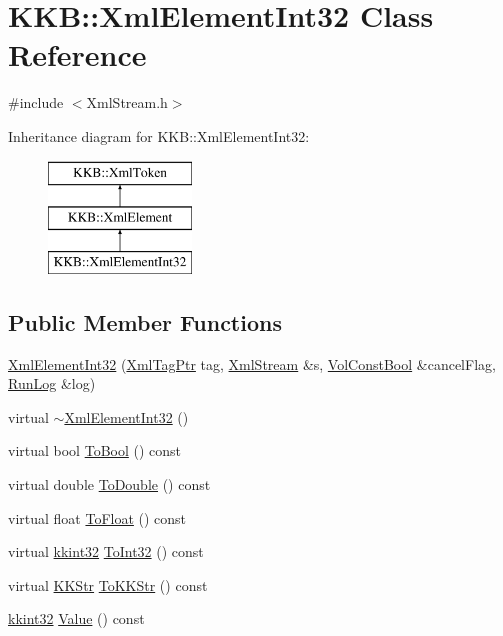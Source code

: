 \hypertarget{class_k_k_b_1_1_xml_element_int32}{}\section{K\+KB\+:\+:Xml\+Element\+Int32 Class Reference}
\label{class_k_k_b_1_1_xml_element_int32}


{\ttfamily \#include $<$Xml\+Stream.\+h$>$}

Inheritance diagram for K\+KB\+:\+:Xml\+Element\+Int32\+:\begin{figure}[H]
\begin{center}
\leavevmode
\includegraphics[height=3.000000cm]{class_k_k_b_1_1_xml_element_int32}
\end{center}
\end{figure}
\subsection*{Public Member Functions}
\begin{DoxyCompactItemize}
\item 
\hyperlink{class_k_k_b_1_1_xml_element_int32_a4f9c90b3dd3ba7e3b9fcb6b60d665d1a}{Xml\+Element\+Int32} (\hyperlink{namespace_k_k_b_a9253a3ea8a5da18ca82be4ca2b390ef0}{Xml\+Tag\+Ptr} tag, \hyperlink{class_k_k_b_1_1_xml_stream}{Xml\+Stream} \&s, \hyperlink{namespace_k_k_b_a7d390f568e2831fb76b86b56c87bf92f}{Vol\+Const\+Bool} \&cancel\+Flag, \hyperlink{class_k_k_b_1_1_run_log}{Run\+Log} \&log)
\item 
virtual \hyperlink{class_k_k_b_1_1_xml_element_int32_afb0b464cfaeac317a6f51b94c3accbcf}{$\sim$\+Xml\+Element\+Int32} ()
\item 
virtual bool \hyperlink{class_k_k_b_1_1_xml_element_int32_aec7a18f2b0e3bf247bf29f21e5256592}{To\+Bool} () const 
\item 
virtual double \hyperlink{class_k_k_b_1_1_xml_element_int32_a1768e0e2b122547832f7d8a73a0f1588}{To\+Double} () const 
\item 
virtual float \hyperlink{class_k_k_b_1_1_xml_element_int32_a1b240dc1bc387f12192575c3257f95e7}{To\+Float} () const 
\item 
virtual \hyperlink{namespace_k_k_b_a8fa4952cc84fda1de4bec1fbdd8d5b1b}{kkint32} \hyperlink{class_k_k_b_1_1_xml_element_int32_a043453a13afcf42b819baf231786e653}{To\+Int32} () const 
\item 
virtual \hyperlink{class_k_k_b_1_1_k_k_str}{K\+K\+Str} \hyperlink{class_k_k_b_1_1_xml_element_int32_af0db95c22ac5abf7158120aab68607c0}{To\+K\+K\+Str} () const 
\item 
\hyperlink{namespace_k_k_b_a8fa4952cc84fda1de4bec1fbdd8d5b1b}{kkint32} \hyperlink{class_k_k_b_1_1_xml_element_int32_a37c999e6762841736ed3d1c03ed87d34}{Value} () const 
\end{DoxyCompactItemize}

